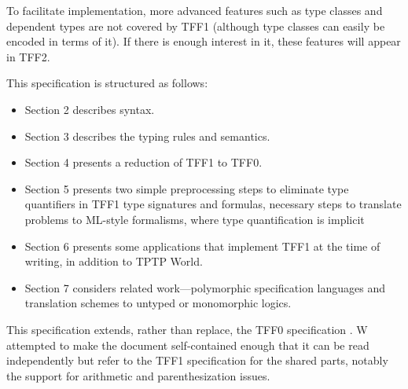 To facilitate implementation, more advanced features such as type classes and
dependent types are not covered by TFF1 (although type classes can easily be
encoded in terms of it). If there is enough interest in it, these features will
appear in TFF2.

This specification is structured as follows:
\begin{itemize}
\item Section 2 describes syntax.
\item Section 3 describes the typing rules and semantics.
\item Section 4 presents a reduction of TFF1 to TFF0.
\item Section 5 presents two simple preprocessing steps to eliminate type
quantifiers in TFF1 type signatures and formulas, necessary steps to translate
problems to ML-style formalisms, where type quantification is implicit
\item Section 6 presents some applications that implement TFF1 at the time of
writing, in addition to TPTP World.
\item Section 7 considers related work---polymorphic specification languages
and translation schemes to untyped or monomorphic logics.
\end{itemize}

This specification extends, rather than replace, the TFF0 specification
\cite{TFF0}. W attempted to make the document self-contained enough that it can
be read independently but refer to the TFF1 specification for the shared parts,
notably the support for arithmetic and parenthesization issues.
